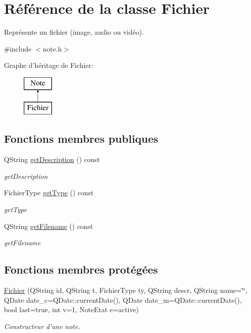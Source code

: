 \hypertarget{class_fichier}{\section{Référence de la classe Fichier}
\label{class_fichier}
}


Représente un fichier (image, audio ou vidéo).  




{\ttfamily \#include $<$note.\-h$>$}

Graphe d'héritage de Fichier\-:\begin{figure}[H]
\begin{center}
\leavevmode
\includegraphics[height=2.000000cm]{class_fichier}
\end{center}
\end{figure}
\subsection*{Fonctions membres publiques}
\begin{DoxyCompactItemize}
\item 
Q\-String \hyperlink{class_fichier_ae8a21cbcf691006c9bf5d1a9cf3c039c}{get\-Description} () const 
\begin{DoxyCompactList}\small\item\em get\-Description \end{DoxyCompactList}\item 
Fichier\-Type \hyperlink{class_fichier_aea8a0b2ea4bf243166ee3b62214d3d3b}{get\-Type} () const 
\begin{DoxyCompactList}\small\item\em get\-Type \end{DoxyCompactList}\item 
Q\-String \hyperlink{class_fichier_ab1f7b30f9fc66ff24c97f65a2956609f}{get\-Filename} () const 
\begin{DoxyCompactList}\small\item\em get\-Filename \end{DoxyCompactList}\end{DoxyCompactItemize}
\subsection*{Fonctions membres protégées}
\begin{DoxyCompactItemize}
\item 
\hyperlink{class_fichier_a7c16ae9e09cd4a3087b084e3328fbb06}{Fichier} (Q\-String id, Q\-String t, Fichier\-Type ty, Q\-String descr, Q\-String name=\char`\"{}\char`\"{}, Q\-Date date\-\_\-c=Q\-Date\-::current\-Date(), Q\-Date date\-\_\-m=Q\-Date\-::current\-Date(), bool last=true, int v=1, Note\-Etat e=active)
\begin{DoxyCompactList}\small\item\em Constructeur d'une note. \end{DoxyCompactList}\end{DoxyCompactItemize}
